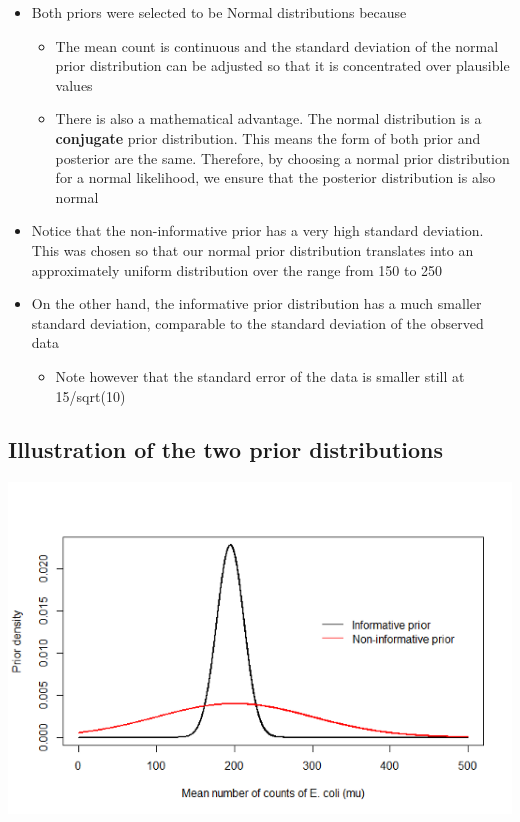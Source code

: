 \documentclass[
]{book}
\providecommand{\tightlist}{%
  \setlength{\itemsep}{0pt}\setlength{\parskip}{0pt}}
\begin{document}
\begin{itemize}
\tightlist
\item
  Both priors were selected to be Normal distributions because

  \begin{itemize}
  \tightlist
  \item
    The mean count is continuous and the standard deviation of the normal prior distribution can be adjusted so that it is concentrated over plausible values
  \item
    There is also a mathematical advantage. The normal distribution is a \textbf{conjugate} prior distribution. This means the form of both prior and posterior are the same. Therefore, by choosing a normal prior distribution for a normal likelihood, we ensure that the posterior distribution is also normal\\
  \end{itemize}
\item
  Notice that the non-informative prior has a very high standard deviation. This was chosen so that our normal prior distribution translates into an approximately uniform distribution over the range from 150 to 250
\item
  On the other hand, the informative prior distribution has a much smaller standard deviation, comparable to the standard deviation of the observed data

  \begin{itemize}
  \tightlist
  \item
    Note however that the standard error of the data is smaller still at
    15/sqrt(10)
  \end{itemize}
\end{itemize}

\hypertarget{illustration-of-the-two-prior-distributions}{%
\subsection{Illustration of the two prior distributions}\label{illustration-of-the-two-prior-distributions}}

\includegraphics[width=0.5\linewidth]{./6_16}
\end{document}

